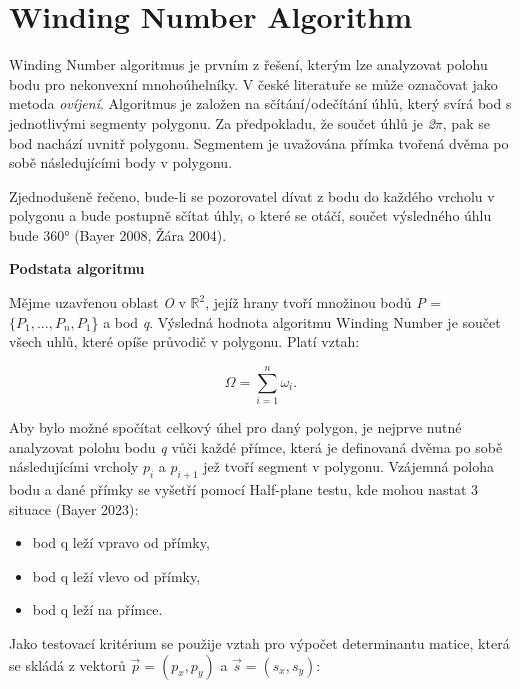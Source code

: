 \section*{Winding Number Algorithm}
\par Winding Number algoritmus je prvním z řešení, kterým lze analyzovat polohu bodu pro nekonvexní mnohoúhelníky. V české literatuře se může označovat jako metoda \emph{ovíjení}. Algoritmus je založen na sčítání/odečítání úhlů, který svírá bod s jednotlivými segmenty polygonu. Za předpokladu, že součet úhlů je \emph{2$\pi$}, pak se bod nachází uvnitř polygonu. Segmentem je uvažována přímka tvořená dvěma po sobě následujícími body v polygonu.
\par Zjednodušeně řečeno, bude-li se pozorovatel dívat z bodu do každého vrcholu v polygonu a bude postupně sčítat úhly, o které se otáčí, součet výsledného úhlu bude 360° (Bayer 2008, Žára 2004).


\par {\large\textbf{Podstata algoritmu} }
\par Mějme uzavřenou oblast \emph{O} v $\mathbb{R}^2$, jejíž hrany tvoří množinou bodů \emph{P} = {$\{P_1, ..., P_n, P_1$\} a bod {\emph{q}}}. Výsledná hodnota algoritmu Winding Number je součet všech uhlů, které opíše průvodič v polygonu. \newline Platí vztah:

\begin{equation}\Omega = \sum_{i=1}^{n} \omega_i.\end{equation}

\par Aby bylo možné spočítat celkový úhel pro daný polygon, je nejprve nutné analyzovat polohu bodu \emph{q} vůči každé přímce, která je definovaná dvěma po sobě následujícími vrcholy $p_i$ a $p_{i+1}$ jež tvoří segment v polygonu. Vzájemná poloha bodu a dané přímky  se vyšetří pomocí Half-plane testu, kde mohou nastat 3 situace (Bayer 2023):

\begin{itemize}
  \item bod q leží vpravo od přímky,
  \item bod q leží vlevo od přímky,
  \item bod q leží na přímce.
\end{itemize}

\par Jako testovací kritérium se použije vztah pro výpočet determinantu matice, která se skládá z vektorů $\vec{p} = (p_x,p_y)$ a $\vec{s} = (s_x,s_y)$:

